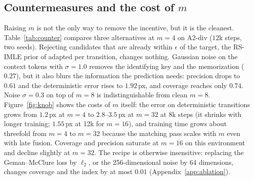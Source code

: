 \subsection{Countermeasures and the cost of $m$}
\label{sec:counter}
Raising $m$ is not the only way to remove the incentive, but it is the cleanest. Table~\ref{tab:counter} compares three alternatives at $m{=}4$ on A2-div ($12$k steps, two seeds). Rejecting candidates that are already within $\epsilon$ of the target, the RS-IMLE prior of \citet{vashist2024rsimle} adapted per transition, changes nothing. Gaussian noise on the context tokens with $\sigma = 1.0$ removes the identifying key and the memorization ($0.27$), but it also blurs the information the prediction needs: precision drops to $0.61$ and the deterministic error rises to $1.92$\,px, and coverage reaches only $0.74$. Noise $\sigma = 0.3$ on top of $m{=}8$ is indistinguishable from clean $m{=}8$. Figure~\ref{fig:knob} shows the costs of $m$ itself: the error on deterministic transitions grows from $1.2$\,px at $m{=}4$ to $2.8$--$3.5$\,px at $m{=}32$ at 8k steps (it shrinks with longer training; $1.55$\,px at 12k for $m{=}16$), and training time grows about threefold from $m{=}4$ to $m{=}32$ because the matching pass scales with $m$ even with late fusion. Coverage and precision saturate at $m{=}16$ on this environment and decline slightly at $m{=}32$. The recipe is otherwise insensitive: replacing the Geman--McClure loss by $\ell_2$, or the 256-dimensional noise by 64 dimensions, changes coverage and the index by at most $0.01$ (Appendix~\ref{app:ablation}).

\begin{table}[t]
\caption{Countermeasures against outcome memorization on A2-div ($K{=}4$, 12k steps, two seeds; the $m{=}4$ and $m{=}16$ rows are the three-seed values of Table~\ref{tab:a2}). The memorization index is given for training / held-out contexts.}
\label{tab:counter}
\begin{center}
\small
{}
\end{center}
\end{table}

